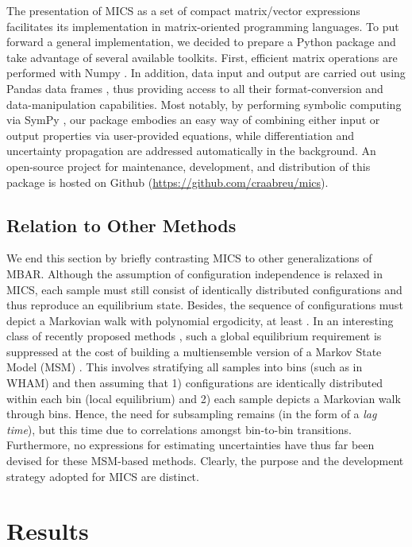 \documentclass[
    journal=jctcce,
    layout=twocolumn
]{achemso}
\begin{document}
The presentation of MICS as a set of compact matrix/vector expressions facilitates its implementation in matrix-oriented programming languages. To put forward a general implementation, we decided to prepare a Python package and take advantage of several available toolkits. First, efficient matrix operations are performed with Numpy \cite{Van_der_walt_2011}. In addition, data input and output are carried out using Pandas data frames \cite{Mckinney_2010}, thus providing access to all their format-conversion and data-manipulation capabilities. Most notably, by performing symbolic computing via SymPy \cite{Meurer_2017}, our package embodies an easy way of combining either input or output properties via user-provided equations, while differentiation and uncertainty propagation are addressed automatically in the background. An open-source project for maintenance, development, and distribution of this package is hosted on Github (\url{https://github.com/craabreu/mics}).

\subsection{Relation to Other Methods}

We end this section by briefly contrasting MICS to other generalizations of MBAR. Although the assumption of configuration independence is relaxed in MICS, each sample must still consist of identically distributed configurations and thus reproduce an equilibrium state. Besides, the sequence of configurations must depict a Markovian walk with polynomial ergodicity, at least \cite{Roy_2018}. In an interesting class of recently proposed methods \cite{Mey_2014, Wu_2014, Rosta_2015, Wu_2016}, such a global equilibrium requirement is suppressed at the cost of building a multiensemble version \cite{Wu_2016} of a Markov State Model (MSM) \cite{Pande_2010, Husic_2018}. This involves stratifying all samples into bins (such as in WHAM) and then assuming that 1) configurations are identically distributed within each bin (local equilibrium) and 2) each sample depicts a Markovian walk through bins. Hence, the need for subsampling remains (in the form of a \textit{lag time}), but this time due to correlations amongst bin-to-bin transitions. Furthermore, no expressions for estimating uncertainties have thus far been devised for these MSM-based methods. Clearly, the purpose and the development strategy adopted for MICS are distinct.

\section{Results}
\end{document}
